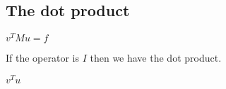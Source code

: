 
\subsection{The dot product}

\(v^TMu=f\)

If the operator is \(I\) then we have the dot product.

\(v^Tu\)

